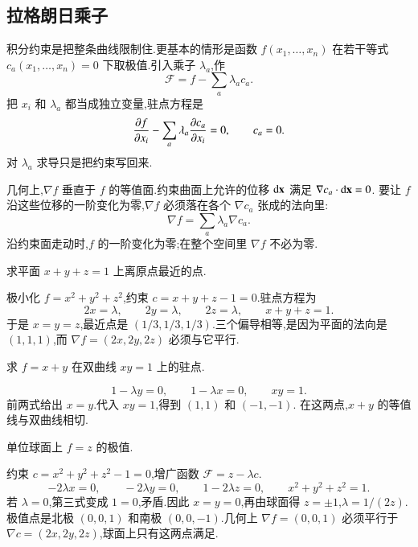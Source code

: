 \subsection{拉格朗日乘子}
积分约束是把整条曲线限制住.更基本的情形是函数 $f(x_1,\ldots,x_n)$ 在若干等式 $c_a(x_1,\ldots,x_n)=0$ 下取极值.引入乘子 $\lambda_a$,作
\begin{equation}
  \mathcal{F} = f - \sum_a \lambda_a c_a .
\end{equation}
把 $x_i$ 和 $\lambda_a$ 都当成独立变量,驻点方程是
\begin{equation}
  \frac{\partial{f}}{\partial{x_i}} - \sum_a \lambda_a \frac{\partial{c_a}}{\partial{x_i}} = 0,
  \qquad c_a = 0 .
\end{equation}
对 $\lambda_a$ 求导只是把约束写回来.

几何上,$\nabla f$ 垂直于 $f$ 的等值面.约束曲面上允许的位移 $\mathrm{d}{\mathbf{x}}$ 满足 $\nabla c_a\cdot\mathrm{d}{\mathbf{x}}=0$.
要让 $f$ 沿这些位移的一阶变化为零,$\nabla f$ 必须落在各个 $\nabla c_a$ 张成的法向里:
\begin{equation}
  \nabla f = \sum_a \lambda_a \nabla c_a .
\end{equation}
沿约束面走动时,$f$ 的一阶变化为零;在整个空间里 $\nabla f$ 不必为零.

\begin{example}
求平面 $x+y+z=1$ 上离原点最近的点.
\end{example}
\begin{solution}
极小化 $f=x^2+y^2+z^2$,约束 $c=x+y+z-1=0$.驻点方程为
\begin{equation}
  2x=\lambda,\qquad 2y=\lambda,\qquad 2z=\lambda,\qquad x+y+z=1.
\end{equation}
于是 $x=y=z$,最近点是 $(1/3,1/3,1/3)$.三个偏导相等,是因为平面的法向是 $(1,1,1)$,而 $\nabla f=(2x,2y,2z)$ 必须与它平行.
\end{solution}

\begin{example}
求 $f=x+y$ 在双曲线 $xy=1$ 上的驻点.
\end{example}
\begin{solution}
\begin{equation}
  1-\lambda y = 0, \qquad 1-\lambda x = 0, \qquad xy=1.
\end{equation}
前两式给出 $x=y$.代入 $xy=1$,得到 $(1,1)$ 和 $(-1,-1)$.
在这两点,$x+y$ 的等值线与双曲线相切.
\end{solution}

\begin{example}
单位球面上 $f=z$ 的极值.
\end{example}
\begin{solution}
约束 $c=x^2+y^2+z^2-1=0$,增广函数 $\mathcal{F}=z-\lambda c$.
\begin{equation}
  -2\lambda x=0,\qquad -2\lambda y=0,\qquad 1-2\lambda z=0,\qquad x^2+y^2+z^2=1.
\end{equation}
若 $\lambda=0$,第三式变成 $1=0$,矛盾.因此 $x=y=0$,再由球面得 $z=\pm 1$,$\lambda=1/(2z)$.极值点是北极 $(0,0,1)$ 和南极 $(0,0,-1)$.几何上 $\nabla f=(0,0,1)$ 必须平行于 $\nabla c=(2x,2y,2z)$,球面上只有这两点满足.
\end{solution}

